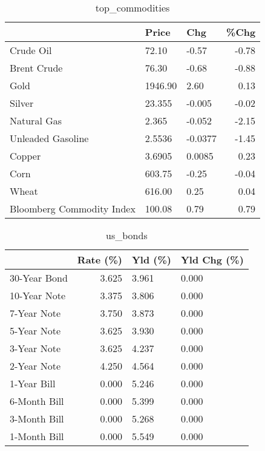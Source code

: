 \documentclass{article}%
\begin{document}
\begin{table}[htbp]%
\caption{top\_commodities}%
\centering%
\begin{adjustbox}{width=1\textwidth}%
\begin{tabular}{lllr}
\toprule
                          &   Price &     Chg &  \%Chg \\
\midrule
               Crude Oil  &   72.10 &   -0.57 & -0.78 \\
             Brent Crude  &   76.30 &   -0.68 & -0.88 \\
                    Gold  & 1946.90 &    2.60 &  0.13 \\
                  Silver  &  23.355 &  -0.005 & -0.02 \\
             Natural Gas  &   2.365 &  -0.052 & -2.15 \\
       Unleaded Gasoline  &  2.5536 & -0.0377 & -1.45 \\
                  Copper  &  3.6905 &  0.0085 &  0.23 \\
                    Corn  &  603.75 &   -0.25 & -0.04 \\
                   Wheat  &  616.00 &    0.25 &  0.04 \\
Bloomberg Commodity Index &  100.08 &    0.79 &  0.79 \\
\bottomrule
\end{tabular}
%
\end{adjustbox}%
\end{table}

%


\begin{table}[htbp]%
\caption{us\_bonds}%
\centering%
\begin{adjustbox}{width=1\textwidth}%
\begin{tabular}{lrll}
\toprule
             &  Rate (\%) & Yld (\%) & Yld Chg (\%) \\
\midrule
30-Year Bond &     3.625 &   3.961 &       0.000 \\
10-Year Note &     3.375 &   3.806 &       0.000 \\
 7-Year Note &     3.750 &   3.873 &       0.000 \\
 5-Year Note &     3.625 &   3.930 &       0.000 \\
 3-Year Note &     3.625 &   4.237 &       0.000 \\
 2-Year Note &     4.250 &   4.564 &       0.000 \\
 1-Year Bill &     0.000 &   5.246 &       0.000 \\
6-Month Bill &     0.000 &   5.399 &       0.000 \\
3-Month Bill &     0.000 &   5.268 &       0.000 \\
1-Month Bill &     0.000 &   5.549 &       0.000 \\
\bottomrule
\end{tabular}
%
\end{adjustbox}%
\end{table}
\end{document}
